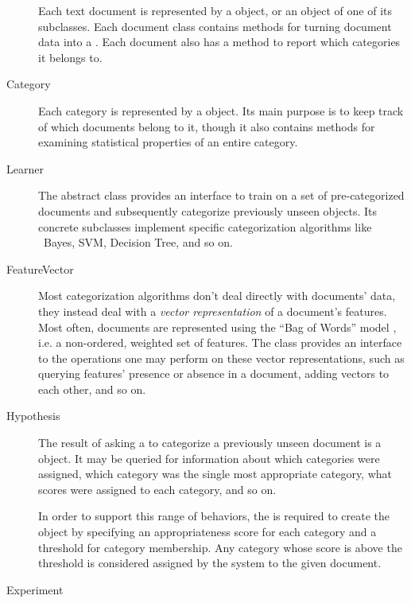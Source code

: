 \begin{description}
Each text document is represented by a  object, or an object
of one of its subclasses.  Each document class contains methods for
turning document data into a .  Each document also has
a method to report which categories it belongs to.

\item[Category]

Each category is represented by a  object.  Its main purpose
is to keep track of which documents belong to it, though it also
contains methods for examining statistical properties of an entire
category.

\item[Learner]

The abstract  class provides an interface to train on a
set of pre-categorized documents and subsequently categorize
previously unseen  objects.  Its
concrete subclasses implement specific categorization algorithms like
\naive\ Bayes, SVM, Decision Tree, and so on.

\item[FeatureVector]

Most categorization algorithms don't deal directly with documents'
data, they instead deal with a \emph{vector representation} of a
document's features.  Most often, documents are represented using the
``Bag of Words'' model \cite[p. 10]{sebastiani:02}, i.e. a non-ordered, weighted set of
features.  The  class provides an interface to the
operations one may perform on these vector representations, such as
querying features' presence or absence in a document, adding vectors
to each other, and so on.

\item[Hypothesis]

The result of asking a  to categorize a previously unseen
document is a  object.  It may be queried for information
about which categories were assigned, which category was the single
most appropriate category, what scores were assigned to each category,
and so on.

In order to support this range of behaviors, the  is
required to create the  object by specifying an
appropriateness score for each category and a threshold for category
membership.  Any category whose score is above the threshold is
considered assigned by the system to the given document.

\item[Experiment]


\end{description}
